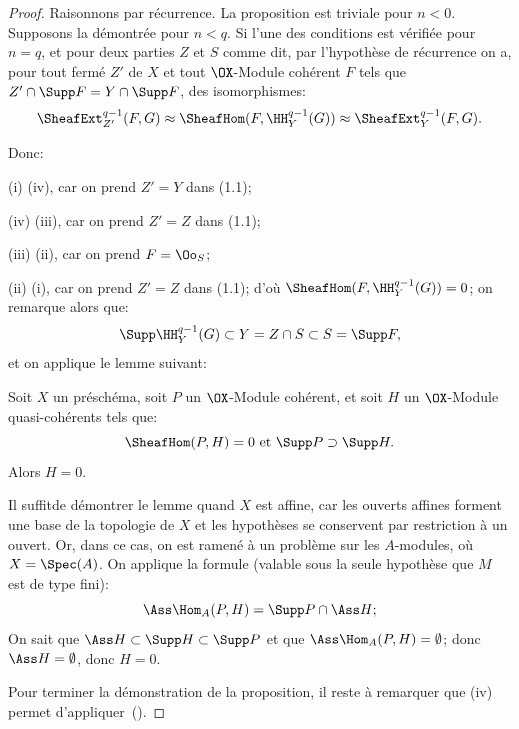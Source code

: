 \begin{proof}
Raisonnons par r\'ecurrence. La proposition est triviale pour $n < 0$. Supposons la d\'emontr\'ee pour $n < q$. Si l'une des conditions est v\'erifi\'ee pour $n = q$, et pour deux parties $Z$ et $S$ comme dit, par l'hypoth\`ese de r\'ecurrence on a, pour tout ferm\'e $Z'$ de $X$ et tout $\OX$-Module coh\'erent $F$ tels que $Z' \cap \Supp F = Y \cap \Supp F$, des isomorphismes:
\begin{equation}\label{eq:VII.1.1}\SheafExt^{q-1}_{Z'} (F, G) \approx \SheafHom (F, \HH^{q-1}_Y (G)) \approx \SheafExt^{q-1}_Y (F, G).\end{equation}

\noindent Donc:

(i) \ALORS (iv), car on prend $Z' = Y$ dans (1.1);

(iv) \ALORS (iii), car on prend $Z' = Z$ dans (1.1);

(iii) \ALORS (ii), car on prend $F = \Oo_S$;

(ii) \ALORS (i), car on prend $Z' = Z$ dans (1.1); d'o\`u $\SheafHom (F, \HH_Y^{q-1} (G)) = 0$; on remarque alors que:
\[
\Supp \HH_Y^{q-1} (G) \subset Y = Z \cap S \subset S = \Supp F,
\]
et on applique le lemme suivant:

\begin{lemme} \label{VII.1.3}
Soit $X$ un pr\'esch\'ema, soit $P$ un $\OX$-Module coh\'erent, et soit $H$ un $\OX$-Module quasi-coh\'erents tels que:
\[
\SheafHom (P, H) = 0 \text{ et } \Supp P \supset \Supp H.
\]
Alors $H = 0$.
\end{lemme}

Il suffit\pageoriginaled de d\'emontrer le lemme quand $X$ est affine, car les ouverts affines forment une base de la topologie de $X$ et les hypoth\`eses se conservent par restriction \`a un ouvert. Or, dans ce cas, on est ramen\'e \`a un probl\`eme sur les $A$-modules, o\`u $X = \Spec(A)$. On applique la formule (valable sous la seule hypoth\`ese que $M$ est de type fini):
\[
\Ass \Hom_A (P, H) = \Supp P \cap \Ass H;\]
On sait que $\Ass H \subset \Supp H \subset \Supp P$ et que $\Ass \Hom_A (P, H) = \emptyset$; donc $\Ass H = \emptyset$, donc $H = 0$.

Pour terminer la d\'emonstration de la proposition, il reste \`a remarquer que (iv) permet d'appliquer~().
\skipqed
\end{proof}

